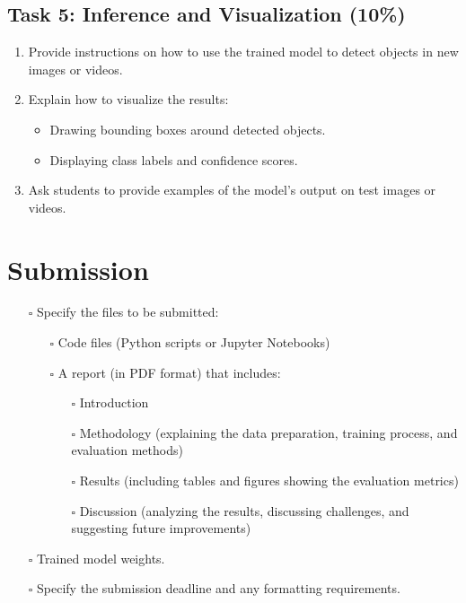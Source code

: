 \documentclass[11pt]{article}
\begin{document}
\subsection{Task 5: Inference and Visualization (10\%)}
\label{sec:orgea16ae2}
\begin{enumerate}
\item Provide instructions on how to use the trained model
to detect objects in new images or videos.
\item Explain how to visualize the results:
\begin{itemize}
\item Drawing bounding boxes around detected objects.
\item Displaying class labels and confidence scores.
\end{itemize}
\item Ask students to provide examples of the model's
output on test images or videos.
\end{enumerate}
\section{Submission}
\label{sec:org420e200}
\begin{itemize}
\item[{$\square$}] Specify the files to be submitted:
\begin{itemize}
\item[{$\square$}] Code files (Python scripts or Jupyter
Notebooks)
\item[{$\square$}] A report (in PDF format) that includes:
\begin{itemize}
\item[{$\square$}] Introduction
\item[{$\square$}] Methodology (explaining the data preparation,
training process, and evaluation methods)
\item[{$\square$}] Results (including tables and figures showing
the evaluation metrics)
\item[{$\square$}] Discussion (analyzing the results, discussing
challenges, and suggesting future improvements)
\end{itemize}
\end{itemize}
\item[{$\square$}] Trained model weights.
\item[{$\square$}] Specify the submission deadline and any
formatting requirements.
\end{itemize}
\end{document}
